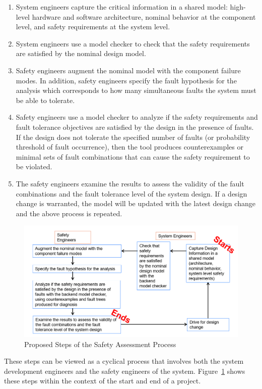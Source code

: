 \begin{enumerate}
	\item System engineers capture the critical information in a shared model:  high-level hardware and software architecture, nominal behavior at the component level, and safety requirements at the system level.
	\item System engineers use a model checker to check that the safety requirements are satisfied by the nominal design model. 
	\item Safety engineers augment the nominal model with the component failure modes. In addition, safety engineers specify the fault hypothesis for the analysis which corresponds to how many simultaneous faults the system must be able to tolerate.
	\item Safety engineers use a model checker to analyze if the safety requirements and fault tolerance objectives are satisfied by the design in the presence of faults. If the design does not tolerate the specified number of faults (or probability threshold of fault occurrence), then the tool produces counterexamples or minimal sets of fault combinations that can cause the safety requirement to be violated.
	\item The safety engineers examine the results to assess the validity of the fault combinations and the fault tolerance level of the system design. If a design change is warranted, the model will be updated with the latest design change and the above process is repeated.
\end{enumerate}

\begin{figure}[h]
	\begin{center}
		\includegraphics[width=\textwidth]{images/SACycle.PNG}
	\end{center}
	\caption{Proposed Steps of the Safety Assessment Process}
	\label{fig:SACycle1}
\end{figure}

These steps can be viewed as a cyclical process that involves both the system development engineers and the safety engineers of the system. Figure~\ref{fig:SACycle1} shows these steps within the context of the start and end of a project. 

